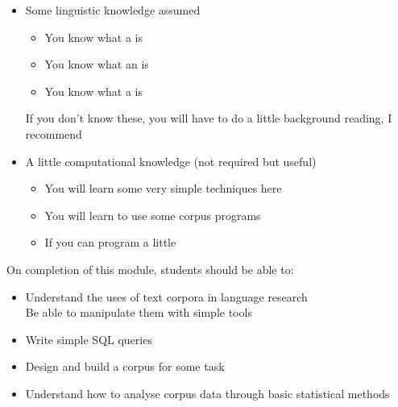 \documentclass[a4paper,landscape,headrule,footrule,xetex]{foils}
\begin{document}

\begin{itemize}
\item Some linguistic knowledge assumed
  \begin{itemize}
  \item You know what a  is
  \item You know what an  is
  \item You know what a  is
  \end{itemize}
 If you don't know these, you will have to do a little background
 reading, I recommend \citet{Huddleston:1988} 
\item A little computational knowledge (not required but useful)
  \begin{itemize}
  \item You will learn some very simple techniques here
  \item You will learn to use some corpus programs
  \item If you can program a little 
  \end{itemize}
\end{itemize}




On completion of this module, students should be able to:

\begin{itemize}
\item Understand the uses of text corpora in language research
  \\ Be able to manipulate them with simple tools
\item Write simple SQL queries
\item Design and build a corpus for some task
\item Understand how to analyse corpus data through basic statistical methods
\end{itemize}
    
\end{document}
